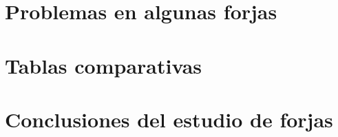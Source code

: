 
\section{Problemas en algunas forjas}
\label{sec:problemas}


\section{Tablas comparativas}
\label{sec:comparativa}


\section{Conclusiones del estudio de forjas}
\label{sec:conclusiones}

